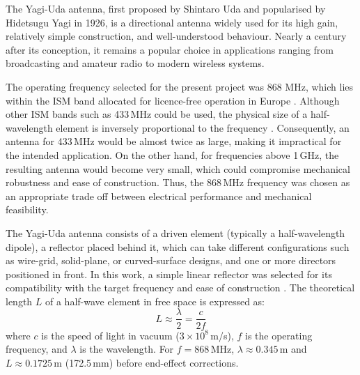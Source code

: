 The Yagi-Uda antenna, first proposed by Shintaro Uda and popularised by Hidetsugu Yagi in 1926, is a directional antenna widely used for its high gain, relatively simple construction, and well-understood behaviour\cite{yagi1926}. Nearly a century after its conception, it remains a popular choice in applications ranging from broadcasting and amateur radio to modern wireless systems.

The operating frequency selected for the present project was 868 MHz, which lies within the ISM band allocated for licence-free operation in Europe \cite{etsi300220}. Although other ISM bands such as 433\,MHz could be used, the physical size of a half-wavelength element is inversely proportional to the frequency \cite{balanis2016}. Consequently, an antenna for 433\,MHz would be almost twice as large, making it impractical for the intended application. On the other hand, for frequencies above 1\,GHz, the resulting antenna would become very small, which could compromise mechanical robustness and ease of construction. Thus, the 868\,MHz frequency was chosen as an appropriate trade off between electrical performance and mechanical feasibility.

The Yagi-Uda antenna consists of a driven element (typically a half-wavelength dipole), a reflector placed behind it, which can take different configurations such as wire-grid, solid-plane, or curved-surface designs, and one or more directors positioned in front. In this work, a simple linear reflector was selected for its compatibility with the target frequency and ease of construction \cite{balanis2016, pozar2011}. The theoretical length $L$ of a half-wave element in free space is expressed as:
\begin{equation}
L \approx \frac{\lambda}{2} = \frac{c}{2 f}
\end{equation}
where $c$ is the speed of light in vacuum ($3 \times 10^{8}$\,m/s), $f$ is the operating frequency, and $\lambda$ is the wavelength. For $f = 868$\,MHz, $\lambda \approx 0.345$\,m and $L \approx 0.1725$\,m (172.5\,mm) before end-effect corrections.\\


